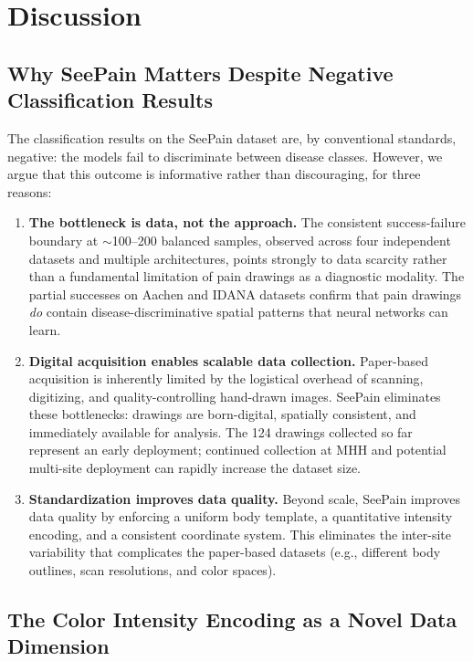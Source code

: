 \documentclass[conference]{IEEEtran}
\begin{document}
\section{Discussion}
\label{sec:discussion}

\subsection{Why SeePain Matters Despite Negative Classification Results}

The classification results on the SeePain dataset are, by conventional standards, negative: the models fail to discriminate between disease classes. However, we argue that this outcome is informative rather than discouraging, for three reasons:

\begin{enumerate}
    \item \textbf{The bottleneck is data, not the approach.} The consistent success-failure boundary at $\sim$100--200 balanced samples, observed across four independent datasets and multiple architectures, points strongly to data scarcity rather than a fundamental limitation of pain drawings as a diagnostic modality. The partial successes on Aachen and IDANA datasets confirm that pain drawings \emph{do} contain disease-discriminative spatial patterns that neural networks can learn.

    \item \textbf{Digital acquisition enables scalable data collection.} Paper-based acquisition is inherently limited by the logistical overhead of scanning, digitizing, and quality-controlling hand-drawn images. SeePain eliminates these bottlenecks: drawings are born-digital, spatially consistent, and immediately available for analysis. The 124 drawings collected so far represent an early deployment; continued collection at MHH and potential multi-site deployment can rapidly increase the dataset size.

    \item \textbf{Standardization improves data quality.} Beyond scale, SeePain improves data quality by enforcing a uniform body template, a quantitative intensity encoding, and a consistent coordinate system. This eliminates the inter-site variability that complicates the paper-based datasets (e.g., different body outlines, scan resolutions, and color spaces).
\end{enumerate}

\subsection{The Color Intensity Encoding as a Novel Data Dimension}
\end{document}
